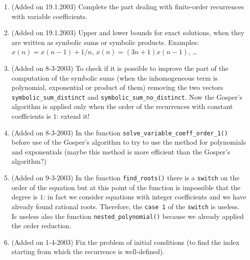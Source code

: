 \documentclass[a4paper]{article}
\begin{document}
\begin{enumerate}
\item (Added on 19.1.2003)
Complete the part dealing with finite-order recurrences with variable
coefficients.

\item (Added on 19.1.2003)
Upper and lower bounds for exact solutions, when they are written as
symbolic sums or symbolic products.
Examples: $x(n) = x(n-1) + 1/n$, $x(n) = (3n+1) x(n-1)$, \dots

\item (Added on 8-3-2003)
To check if it is possible to improve the part of the computation of the
symbolic sums (when the inhomogeneous term is polynomial, exponential or
product of them) removing the two vectors \texttt{symbolic\_sum\_distinct} and
\texttt{symbolic\_sum\_no\_distinct}.
Now the Gosper's algorithm is applied only when the order of the recurrences
with constant coefficients is $1$: extend it! 

\item (Added on 8-3-2003)
In the function \texttt{solve\_variable\_coeff\_order\_1()} before use of the
Gosper's algorithm to try to use the method for polynomials and
exponentials (maybe this method is more efficient than the
Gosper's algorithm?)

\item (Added on 9-3-2003)
In the function \texttt{find\_roots()} there is a \texttt{switch} on the
order of the equation but at this point of the function is impossible
that the degree is $1$: in fact we consider equations with integer
coefficients and we have already found rational roots.
Therefore, the \texttt{case 1} of the \texttt{switch} is useless.
Is useless also the function \texttt{nested\_polynomial()} because
we already applied the order reduction. 

\item (Added on 1-4-2003)
Fix the problem of initial conditions (to find the index starting from which
the recurrence is well-defined).

\end{enumerate}
\end{document}
